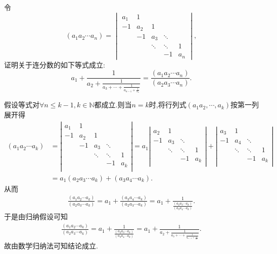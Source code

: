 \documentclass[../../main.tex]{subfiles}%
\begin{document}
\begin{example}
令
\[
\left( a_{1} a_{2} \cdots a_{n} \right) = 
\begin{vmatrix}
a_{1} & 1 &   &   &   \\
-1 & a_{2} & 1 &   &   \\
& -1 & a_{3} & \ddots &   \\
&   & \ddots & \ddots & 1 \\
&   &   & -1 & a_{n}
\end{vmatrix},
\]
证明关于连分数的如下等式成立:
\[
a_{1} + \frac{1}{a_{2} + \frac{1}{a_{3} + \cdots + \frac{1}{a_{n - 1} + \frac{1}{a_{n}}}}} = \frac{\left( a_{1} a_{2} \cdots a_{n} \right)}{\left( a_{2} a_{3} \cdots a_{n} \right)}.
\]
\end{example}
\begin{solution}

假设等式对$\forall n\leqslant  k-1,k\in \mathbb{N}$都成立.则当$n=k$时,将行列式$(a_1a_2,\cdots,a_k)$按第一列展开得
\begin{align*}
\left( a_1a_2\cdots a_k \right) &=\left| \begin{matrix}
a_1&		1&		&		&		\\
-1&		a_2&		1&		&		\\
&		-1&		a_3&		\ddots&		\\
&		&		\ddots&		\ddots&		1\\
&		&		&		-1&		a_k\\
\end{matrix} \right|=a_1\left| \begin{matrix}
a_2&		1&		&		\\
-1&		a_3&		\ddots&		\\
&		\ddots&		\ddots&		1\\
&		&		-1&		a_k\\
\end{matrix} \right|+\left| \begin{matrix}
a_3&		1&		&		\\
-1&		a_4&		\ddots&		\\
&		\ddots&		\ddots&		1\\
&		&		-1&		a_k\\
\end{matrix} \right|
\\
&=a_1\left( a_2a_3\cdots a_k \right) +\left( a_3a_4\cdots a_k \right).
\end{align*}
从而
\begin{align*}
\frac{\left( a_1a_2\cdots a_k \right)}{\left( a_2a_3\cdots a_k \right)}=a_1+\frac{\left( a_3a_4\cdots a_k \right)}{\left( a_2a_3\cdots a_k \right)}=a_1+\frac{1}{\frac{\left( a_2a_3\cdots a_k \right)}{\left( a_3a_4\cdots a_k \right)}}.
\end{align*}
于是由归纳假设可知
\begin{align*}
\frac{\left( a_1a_2\cdots a_k \right)}{\left( a_2a_3\cdots a_k \right)}=a_1+\frac{1}{\frac{\left( a_2a_3\cdots a_k \right)}{\left( a_3a_4\cdots a_k \right)}}=a_1+\frac{1}{a_2+\frac{1}{a_3+\cdots +\frac{1}{a_{n-1}+\frac{1}{a_n}}}}.
\end{align*}
故由数学归纳法可知结论成立.

\end{solution}
\end{document}
